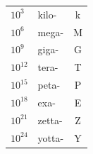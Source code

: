 \begin{frame}{}
\begin{columns}
\begin{table}
{\begin{tabular}{@{}llc@{}}
                    $10^{3}$                & kilo-            & k                    \\
                    $10^{6}$                & mega-            & M                    \\
                    $10^{9}$                & giga-            & G                    \\
                    $10^{12}$               & tera-            & T                    \\
                    $10^{15}$               & peta-            & P                    \\
                    $10^{18}$               & exa-             & E                    \\
                    $10^{21}$               & zetta-           & Z                    \\
                    $10^{24}$               & yotta-           & Y                    \\
                    \bottomrule
                \end{tabular}
            }
            \label{tab:Potencias_base_10}
        \end{table}


\end{columns}
\end{frame}
